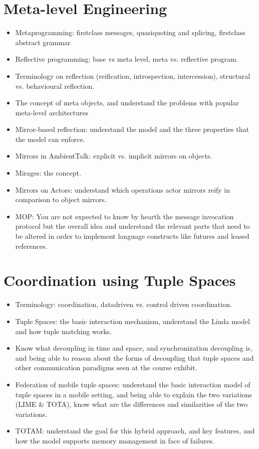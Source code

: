 \documentclass[a4paper]{report}
\begin{document}
\chapter{Meta-level Engineering}
\begin{itemize}
  \item Metaprogramming: firstclass messages, quasiquoting and splicing, firstclass abstract
  grammar
  \item Reflective programming: base vs meta level, meta vs. reflective program.
  \item Terminology on reflection (reification, introspection, intercession), structural vs.
  behavioural reflection.
  \item The concept of meta objects, and understand the problems with popular meta-level
  architectures
  \item Mirror-based reflection: understand the model and the three properties that the model
  can enforce.
  \item Mirrors in AmbientTalk: explicit vs. implicit mirrors on objects.
  \item Mirages: the concept.
  \item Mirrors on Actors: understand which operations actor mirrors reify in comparison to
  object mirrors.
  \item MOP: You are not expected to know by hearth the message invocation protocol but
  the overall idea and understand the relevant parts that need to be altered in order to
  implement language constructs like futures and leased references.
\end{itemize}


\chapter{Coordination using Tuple Spaces}
\begin{itemize}
  \item Terminology: coordination, datadriven vs. control driven coordination.
  \item Tuple Spaces: the basic interaction mechanism, understand the Linda model and how tuple matching works.
  \item Know what decoupling in time and space, and synchronization decoupling is, and being able to reason about the forms of decoupling that tuple spaces and other communication paradigms seen at the course exhibit.
  \item Federation of mobile tuple spaces: understand the basic interaction model of tuple spaces in a mobile setting, and being able to explain the two variations (LIME \& TOTA), know what are the differences and similarities of the two variations.
  \item TOTAM: understand the goal for this hybrid approach, and key features, and how the model supports memory management in face of failures.
\end{itemize}
\end{document}
